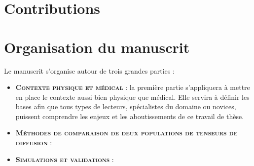 \section*{Contributions}

\section*{Organisation du manuscrit}
Le manuscrit s'organise autour de trois grandes parties :

\begin{itemize}
    \item \textsc{ \textbf{Contexte physique et médical}} : la première partie s'appliquera à mettre en place le contexte aussi bien physique que médical. Elle servira à définir les bases afin que tous types de lecteurs, spécialistes du domaine ou novices, puissent comprendre les enjeux et les aboutissements de ce travail de thèse.
    \item \textsc{ \textbf{Méthodes de comparaison de deux populations de tenseurs de diffusion}} :
    \item \textsc{ \textbf{Simulations et validations}} :
\end{itemize}



